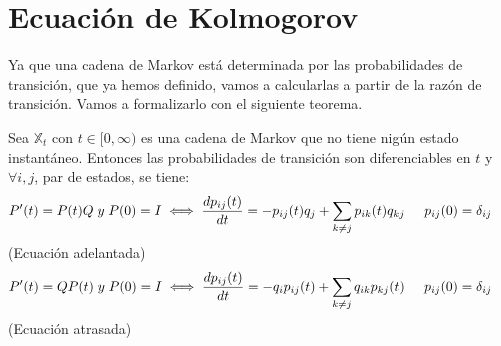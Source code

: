 \documentclass[12pt,a4paper]{article}
\begin{document}
\section{Ecuación de Kolmogorov}
	Ya que una cadena de Markov está determinada por las probabilidades de transición, que ya hemos definido, vamos a calcularlas a partir de la razón de transición. Vamos a formalizarlo con el siguiente teorema.
	\begin{theorem} Sea $\mathbb{X}_{t}$ con $t \in [0,\infty)$ es una cadena de Markov que no tiene nigún estado instantáneo. Entonces las probabilidades de transición son diferenciables en $t$ y $\forall i,j$, par de estados, se tiene:
		\begin{equation*}
			P'(t) = P(t)Q\hspace{0.1cm}y\hspace{0.1cm}P(0) = I \iff \frac{dp_{ij}(t)}{dt} = -p_{ij}(t)q_{j} + \sum_{k \neq j} p_{ik}(t)q_{kj} \hspace{0.5cm} p_{ij}(0) = \delta_{ij} \hspace{0.5cm}
		\end{equation*}
		(Ecuación adelantada)
		\begin{equation*}
			P'(t) = QP(t)\hspace{0.1cm}y\hspace{0.1cm}P(0) = I \iff \frac{dp_{ij}(t)}{dt} = -q_{i}p_{ij}(t) + \sum_{k \neq j} q_{ik}p_{kj}(t) \hspace{0.5cm} p_{ij}(0) = \delta_{ij} \hspace{0.5cm}
		\end{equation*}
		(Ecuación atrasada)
	\end{theorem}
\end{document}
